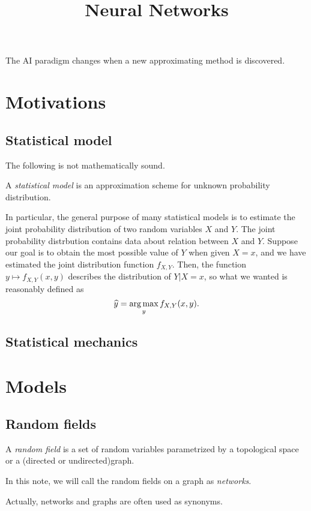 \documentclass{../exp}
\title{Neural Networks}
\begin{document}
\maketitle
\tableofcontents

The AI paradigm changes when a new approximating method is discovered.

\section{Motivations}


\subsection{Statistical model}
The following is not mathematically sound.
\begin{defn}
A \emph{statistical model} is an approximation scheme for unknown probability distribution.
\end{defn}
In particular, the general purpose of many statistical models is to estimate the joint probability distribution of two random variables $X$ and $Y$.
The joint probability distrbution contains data about relation between $X$ and $Y$.
Suppose our goal is to obtain the most possible value of $Y$ when given $X=x$, and we have estimated the joint distribution function $f_{X,Y}$.
Then, the function $y\mapsto f_{X,Y}(x,y)$ describes the distribution of $Y|X=x$, so what we wanted is reasonably defined as
\[\widehat y=\operatorname*{arg\,max}_yf_{X,Y}(x,y).\]

\subsection{Statistical mechanics}

\section{Models}

\subsection{Random fields}
\begin{defn}
A \emph{random field} is a set of random variables parametrized by a topological space or a (directed or undirected)graph.
\end{defn}
\begin{defn}
In this note, we will call the random fields on a graph as \emph{networks}.
\end{defn}
Actually, networks and graphs are often used as synonyms.
\end{document}
